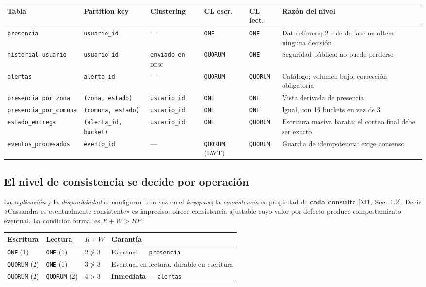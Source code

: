 \documentclass[11pt,a4paper]{article}
\newcommand{\mI}[1]{\textcolor{acento}{\small[M1,~Sec.~#1]}}
\begin{document}
\begin{center}\scriptsize
\begin{tabular}{@{}p{2.95cm}p{2.65cm}p{1.8cm}p{1.45cm}p{1.45cm}p{2.9cm}@{}}
\toprule
\textbf{Tabla} & \textbf{Partition key} & \textbf{Clustering} & \textbf{CL escr.} & \textbf{CL lect.} & \textbf{Razón del nivel} \\
\midrule
\texttt{presencia} & \texttt{usuario\_id} & — & \texttt{ONE} & \texttt{ONE} & Dato efímero; 2 s de desfase no altera ninguna decisión \\
\addlinespace
\texttt{historial\_usuario} & \texttt{usuario\_id} & \texttt{enviado\_en} \textsc{desc} & \texttt{QUORUM} & \texttt{ONE} & Seguridad pública: no puede perderse \\
\addlinespace
\texttt{alertas} & \texttt{alerta\_id} & — & \texttt{QUORUM} & \texttt{QUORUM} & Catálogo; volumen bajo, corrección obligatoria \\
\addlinespace
\texttt{presencia\_por\_zona} & \texttt{(zona, estado)} & \texttt{usuario\_id} & \texttt{ONE} & \texttt{ONE} & Vista derivada de presencia \\
\addlinespace
\texttt{presencia\_por\_comuna} & \texttt{(comuna, estado)} & \texttt{usuario\_id} & \texttt{ONE} & \texttt{ONE} & Igual, con 16 buckets en vez de 3 \\
\addlinespace
\texttt{estado\_entrega} & \texttt{(alerta\_id, bucket)} & \texttt{usuario\_id} & \texttt{ONE} & \texttt{QUORUM} & Escritura masiva barata; el conteo final debe ser exacto \\
\addlinespace
\texttt{eventos\_procesados} & \texttt{evento\_id} & — & \texttt{QUORUM} (LWT) & \texttt{QUORUM} & Guardia de idempotencia: exige consenso \\
\bottomrule
\end{tabular}
\end{center}

\subsection{El nivel de consistencia se decide por operación}
La \emph{replicación} y la \emph{disponibilidad} se configuran una vez en el
\emph{keyspace}; la \emph{consistencia} es propiedad de \textbf{cada consulta}
\mI{1.2}. Decir «Cassandra es eventualmente consistente» es impreciso: ofrece
consistencia ajustable cuyo valor por defecto produce comportamiento eventual. La
condición formal es $R+W>RF$:

\begin{center}\small
\begin{tabular}{@{}llll@{}}
\toprule
\textbf{Escritura} & \textbf{Lectura} & $R+W$ & \textbf{Garantía} \\
\midrule
\texttt{ONE} (1) & \texttt{ONE} (1) & $2 \not> 3$ & Eventual — \texttt{presencia} \\
\texttt{QUORUM} (2) & \texttt{ONE} (1) & $3 \not> 3$ & Eventual en lectura, durable en escritura \\
\texttt{QUORUM} (2) & \texttt{QUORUM} (2) & $4 > 3$ & \textbf{Inmediata} — \texttt{alertas} \\
\bottomrule
\end{tabular}
\end{center}
\end{document}
